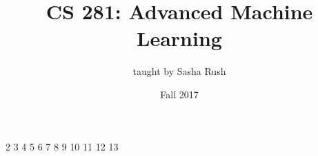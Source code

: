 \documentclass{article}
\begin{document}
\title{CS 281: Advanced Machine Learning}
\date{Fall 2017}
\author{taught by Sasha Rush}
\maketitle

\tableofcontents
\eject

{2}
{3}
{4}
{5}
{6}
{7}
{8}
{9}
{10}
{11}
{12}
{13}
\end{document}
